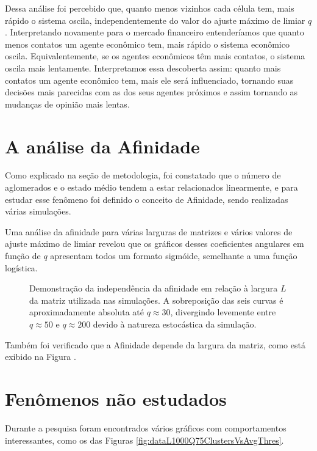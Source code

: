 \documentclass[
	12pt,				%
	openright,			%
	twoside,			%
	a4paper,			%
	english,			%
	french,				%
	spanish,			%
	brazil				%
	]{abntex2}
\begin{document}
Dessa análise foi percebido que, quanto menos vizinhos cada célula tem, mais rápido o sistema oscila, independentemente do valor do ajuste máximo de limiar $q$. Interpretando novamente para o mercado financeiro entenderíamos que quanto menos contatos um agente econômico tem, mais rápido o sistema econômico oscila. Equivalentemente, se os agentes econômicos têm mais contatos, o sistema oscila mais lentamente. Interpretamos essa descoberta assim: quanto mais contatos um agente econômico tem, mais ele será influenciado, tornando suas decisões mais parecidas com as dos seus agentes próximos e assim tornando as mudanças de opinião mais lentas.

\section{A análise da Afinidade}
Como explicado na seção de metodologia, foi constatado que o número de aglomerados e o estado médio tendem a estar relacionados linearmente, e para estudar esse fenômeno foi definido o conceito de Afinidade, sendo realizadas várias simulações.

Uma análise da afinidade para várias larguras de matrizes e vários valores de ajuste máximo de limiar revelou que os gráficos desses coeficientes angulares em função de $q$ apresentam todos um formato sigmóide, semelhante a uma função logística. 
\begin{figure}
    \centering
    \caption{Demonstração da independência da afinidade em relação à largura $L$ da matriz utilizada nas simulações. A sobreposição das seis curvas é aproximadamente absoluta até $q\approx 30$, divergindo levemente entre $q\approx 50$ e $q\approx 200$ devido à natureza estocástica da simulação.}
    \label{fig:afinidadesQ0a200L750a2000}
\end{figure}

Também foi verificado que a Afinidade depende da largura da matriz, como está exibido na Figura .

\section{Fenômenos não estudados}

Durante a pesquisa foram encontrados vários gráficos com comportamentos interessantes, como os das Figuras \ref{fig:dataL1000Q75ClustersVsAvgThres}.

\end{document}
